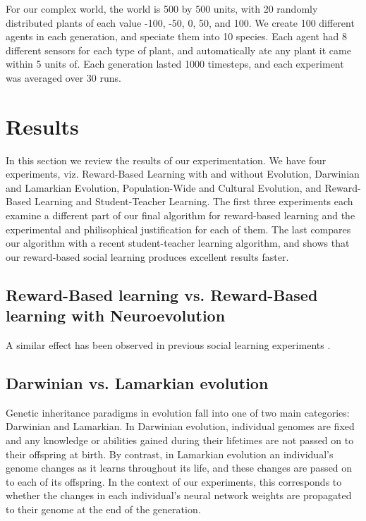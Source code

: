\documentclass{acm_proc_article-sp}
\begin{document}
For our complex world, the world is 500 by 500 units, with 20 randomly distributed plants of each value -100, -50, 0, 50, and 100. We create 100 different agents in each generation, and speciate them into 10 species. Each agent had 8 different sensors for each type of plant, and automatically ate any plant it came within 5 units of. Each generation lasted 1000 timesteps, and each experiment was averaged over 30 runs.

\section{Results}
\label{sec:results}
In this section we review the results of our experimentation.  We have four experiments, viz. Reward-Based Learning with and without Evolution, Darwinian and Lamarkian Evolution, Population-Wide and Cultural Evolution, and Reward-Based Learning and Student-Teacher Learning.   The first three experiments each examine a different part of our final algorithm for reward-based learning and the experimental and philisophical justification for each of them.  The last compares our algorithm with a recent student-teacher learning algorithm, and shows that our reward-based social learning produces excellent results faster.

\subsection*{Reward-Based learning vs. Reward-Based learning with Neuroevolution}
A similar effect has been observed in previous social learning experiments \cite{denaro1996cultural}.

\subsection*{Darwinian vs. Lamarkian evolution}

Genetic inheritance paradigms in evolution fall into one of two main categories: Darwinian and Lamarkian. In Darwinian evolution, individual genomes are fixed and any knowledge or abilities gained during their lifetimes are not passed on to their offspring at birth. By contrast, in Lamarkian evolution an individual's genome changes as it learns throughout its life, and these changes are passed on to each of its offspring. In the context of our experiments, this corresponds to whether the changes in each individual's neural network weights are propagated to their genome at the end of the generation.
\end{document}
